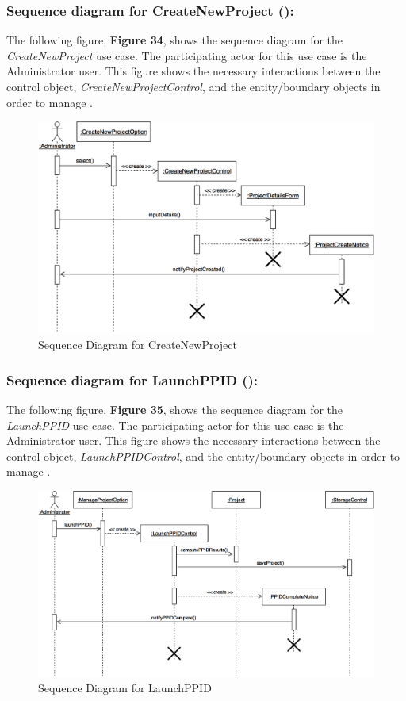 \documentclass[12pt,letterpaper]{article}
\begin{document}
\subsubsection*{Sequence diagram for CreateNewProject (\createnewproject{}):}

The following figure, {\bf Figure 34}, shows the sequence diagram for the {\it CreateNewProject} use case. The participating actor for this use case is
the Administrator user. This figure shows the necessary interactions between the control object, {\it CreateNewProjectControl}, and the
entity/boundary objects in order to manage \createnewproject{}.

\begin{figure}[H]
	\centering{}
	\includegraphics[scale=0.3]{imgs/seq/create-new-project.png}
	\caption{Sequence Diagram for CreateNewProject}
\end{figure}

\subsubsection*{Sequence diagram for LaunchPPID (\launchppid{}):}

The following figure, {\bf Figure 35}, shows the sequence diagram for the {\it LaunchPPID} use case. The participating actor for this use case is
the Administrator user. This figure shows the necessary interactions between the control object, {\it LaunchPPIDControl}, and the
entity/boundary objects in order to manage \launchppid{}.

\begin{figure}[H]
	\centering{}
	\includegraphics[scale=0.3]{imgs/seq/launch-ppid.png}
	\caption{Sequence Diagram for LaunchPPID}
\end{figure}
\end{document}
